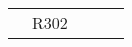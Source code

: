\begin{landscape}
\begin{table}[]
\begin{tabular}{c|c|c|c|c}
                                                                                                 & R302                                                                                                  &                                                                                                      &                                                                                              &                                                                                                                                                                                                                                                                                                                                                                                                                                                                                                                                                                                                                                                                                                                                                                                                                                                                                                                           \\
                                                                                                 

\end{tabular}
\end{table}
\end{landscape}
